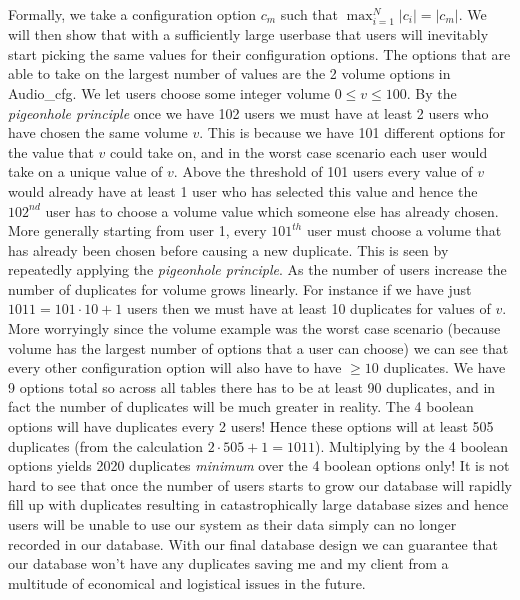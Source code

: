 Formally, we
take a configuration option $c_m$ such that
$\max_{i=1}^{N} |c_i| = |c_m|$. We will then show that with a 
sufficiently large userbase that users will inevitably start
picking the same values for their configuration options. The 
options that are able to take on the largest number of values 
are the 2 volume options in {\sffamily Audio\_cfg}. We let 
users choose some integer volume $0 \leq v \leq 100$. By the 
\textit{pigeonhole principle} once we have 102 users we 
must have at least 2 users who have chosen the same 
volume $v$. This is because we have 101 different options for 
the value that $v$ could take on, and in the worst case 
scenario each user would take on a unique value of $v$. Above
the threshold of 101 users every value of $v$ would already 
have at least 1 user who has selected this value and hence the
$102^{nd}$ user has to choose a volume value which someone else
has already chosen. More generally starting from user 1, every
$101^{th}$ user must choose a volume that has already been 
chosen before causing a new duplicate. This is seen by 
repeatedly applying the \textit{pigeonhole principle}. As the
number of users increase the number of duplicates for volume
grows linearly. For instance if we have just 
$1011 = 101 \cdot 10 + 1$ users then we must
have at least 10 duplicates for values of $v$. More worryingly
since the volume example was the worst case scenario (because
volume has the largest number of options that a user can 
choose) we can see that every other configuration option will 
also have to have $\geq 10$ duplicates. We have 9 options 
total so across all tables there has to be at least 90
duplicates, and in fact the number of duplicates will be much 
greater in reality. The 4 boolean options will have
duplicates every 2 users! Hence these options will at least
505 duplicates (from the calculation $2 \cdot 505 + 1 = 1011$).
Multiplying by the 4 boolean options yields 2020 duplicates
\textit{minimum} over the 4 boolean options only! It is not 
hard to see that once the number of users starts to grow our
database will rapidly fill up with duplicates resulting in
catastrophically large database sizes and hence users will be
unable to use our system as their data simply can no longer  
recorded in our database. With our final database design we 
can guarantee that our database won't have any duplicates 
saving me and my client from a multitude of economical and 
logistical issues in the future. \\ \vspace{0.2cm}

